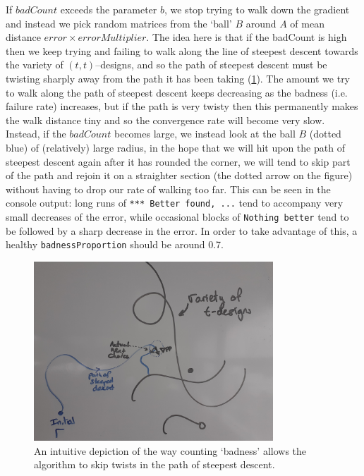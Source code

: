 \documentclass{article}
\theoremstyle{definition}
\begin{document}
  If $ badCount $ exceeds the parameter $ b $, we stop trying to walk down the gradient and instead we pick
  random matrices from the `ball' $ B $ around $ A $ of mean distance $ error\times errorMultiplier$. The idea here
  is that if the badCount is high then we keep trying and failing to walk along the line of steepest descent
  towards the variety of $ (t,t)$--designs, and so the path of steepest descent must be twisting sharply away
  from the path it has been taking (\cref{fig:badness_illustration}). The amount we try to walk along the path
  of steepest descent keeps decreasing as the badness (i.e. failure rate) increases, but if the path is very
  twisty then this permanently makes the walk distance tiny and so the convergence rate will become very slow.
  Instead, if the $badCount$ becomes large, we instead look at the ball $ B $ (dotted blue) of (relatively) large radius, in
  the hope that we will hit upon the path of steepest descent again after it has rounded the corner, we will tend
  to skip part of the path and rejoin it on a straighter section (the dotted arrow on the figure) without having to
  drop our rate of walking too far. This can be seen in the console output: long runs of \texttt{*** Better found, ...} tend to
  accompany very small decreases of the error, while occasional blocks of \texttt{Nothing better}  tend to be followed by a sharp decrease
  in the error. In order to take advantage of this, a healthy \texttt{badnessProportion} should be around 0.7.

  \begin{figure}
    \centering
    \includegraphics[width=0.8\textwidth]{badness_illustration}
    \caption{An intuitive depiction of the way counting `badness' allows the algorithm to skip twists in the path of steepest descent.\label{fig:badness_illustration}}
  \end{figure}
\end{document}
